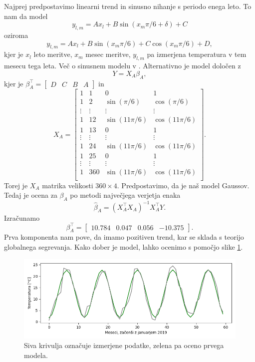\documentclass[12pt, a4paper]{article}
\begin{document}
Najprej predpostavimo linearni trend in sinusno nihanje s periodo 
enega leto. To nam da model
\[
    y_{l,m} = Ax_l + B\sin(x_m\pi/6 + \delta) + C
\]
oziroma
\[
    y_{l,m} = Ax_l + B\sin(x_m\pi/6) + C\cos(x_m\pi/6) + D,
\]
kjer je $x_l$ leto meritve, $x_m$ mesec meritve, $y_{l,m}$ pa 
izmerjena temperatura v tem mesecu tega leta. Več o sinusnem 
modelu v \cite{wiki:Sinusoidal_model}. Alternativno je model 
določen z
\[
    Y = X_A\beta_A,
\]
kjer je $\beta_A^\top = \begin{bmatrix}
    D & C & B & A
\end{bmatrix}$ in
\[
    X_A = \begin{bmatrix}
        1 & 1 & 0 & 1 \\
        1 & 2 & \sin\left(\pi/6\right) & \cos\left(\pi/6\right) \\
        \vdots & \vdots & \vdots & \vdots \\
        1 & 12 &  \sin\left(11\pi/6\right) & \cos\left(11\pi/6\right) \\
        1 & 13 & 0 & 1 \\
        \vdots & \vdots & \vdots & \vdots \\
        1 & 24 &  \sin\left(11\pi/6\right) & \cos\left(11\pi/6\right) \\
        1 & 25 &  0 & 1 \\
        \vdots & \vdots & \vdots & \vdots \\
        1 & 360 & \sin\left(11\pi/6\right) & \cos\left(11\pi/6\right)\\
        \end{bmatrix}.
\]
Torej je $X_A$ matrika velikosti $360 \times 4$. Predpostavimo, da je 
naš model Gaussov. Tedaj je ocena za $\beta_A$ po metodi največjega 
verjetja enaka
\[
    \hat \beta_A = (X_A^\top X_A)^{-1} X_A^\top Y.
\]
Izračunamo
\[
    \beta_A^\top = \begin{bmatrix}
        10.784 & 0.047 & 0.056 & -10.375
    \end{bmatrix}.
\]
Prva komponenta nam pove, da imamo pozitiven trend, kar se sklada 
s teorijo globalnega segrevanja. Kako dober je model, lahko ocenimo s pomočjo slike 
\ref{png:prvi}.
\begin{figure}[H]
    \centering
    \includegraphics[width=14cm]{Slike/prvi_model.png}
    \caption{Siva krivulja označuje izmerjene podatke, zelena pa oceno 
    prvega modela.}
    \label{png:prvi}
\end{figure}
\end{document}
